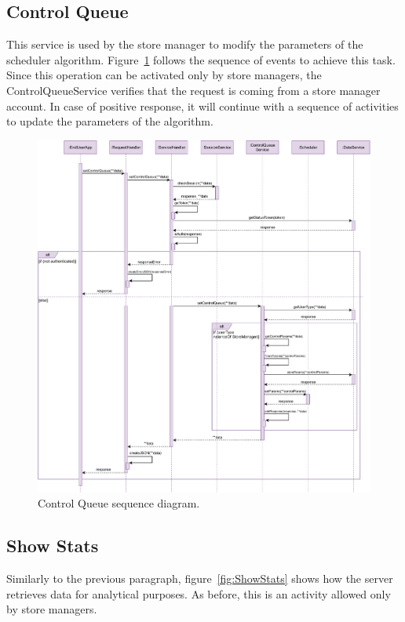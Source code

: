 \subsection{Control Queue}

This service is used by the store manager to modify the parameters of the scheduler algorithm.
Figure~\ref{fig:ControlQueue} follows the sequence of events to achieve this task. Since this operation can be activated only by store managers, the ControlQueueService verifies that the request is coming from a store manager account. In case of positive response, it will continue with a sequence of activities to update the parameters of the algorithm.

\begin{figure}[H]
    \centering
    \includegraphics[width=1.0\textwidth]{images/controlQueue_sequence_diagram.pdf}
    \caption{Control Queue sequence diagram.}\label{fig:ControlQueue}
\end{figure}

\subsection{Show Stats}

Similarly to the previous paragraph, figure~\ref{fig:ShowStats} shows how the server retrieves data for analytical purposes. As before, this is an activity allowed only by store managers.

